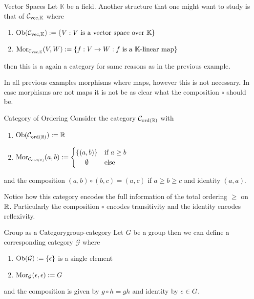 \begin{example}{Vector Spaces}{}
Let $\mathbb{K}$ be a field. Another structure that one might want to study is that of $\mathcal{C}_{\mathrm{vec}, \mathbb{K}}$ where
\begin{enumerate}
    \item $\mathrm {Ob}(\mathcal{C}_{\mathrm{vec}, \mathbb{K}}) := \{V : \text{$V$ is a vector space over $\mathbb{K}$}\}$
    \item $\mathrm {Mor}_{\mathcal{C}_{\mathrm{vec}, \mathbb{K}}}(V,W) := \{f: V \to W : \text{$f$ is a $\mathbb{K}$-linear map}\}$
\end{enumerate}
then this is a again a category for same reasons as in the previous example.
\end{example}

In all previous examples morphisms where maps, however this is not necessary. In case morphisms are not maps it is not be as clear what the composition $\circ$ should be.

\begin{example}{Category of Ordering}{}
Consider the category $\mathcal{C}_{\mathrm{ord}(\mathbb R)}$ with
\begin{enumerate}
    \item $\mathrm {Ob}(\mathcal{C}_{\mathrm{ord}(\mathbb R)}) := \mathbb R$
    \item $\mor_{\C_{\mathrm{ord}(\R)}}(a,b) := \begin{cases}
        \{(a,b)\} & \text{if $a \ge b$} \\
        \hfil \emptyset & \text{else}
    \end{cases}$
\end{enumerate}
and the composition $(a,b) \circ (b,c) = (a,c)$ if $a \ge b \ge c$ and identity $(a,a)$.

Notice how this category encodes the full information of the total ordering $\ge$ on $\mathbb R$. Particularly the composition $\circ$ encodes transitivity and the identity encodes reflexivity.
\end{example}

\begin{example}{Group as a Category}{group-category}
Let $G$ be a group then we can define a corresponding category $\mathcal{G}$ where
\begin{enumerate}
    \item $\mathrm {Ob}(\mathcal{G}) := \{\epsilon\}$ is a single element
    \item $\mathrm {Mor}_{\mathcal{G}}(\epsilon,\epsilon) := G$
\end{enumerate}
and the composition is given by $g \circ h = gh$ and identity by $e \in G$.
\end{example}

